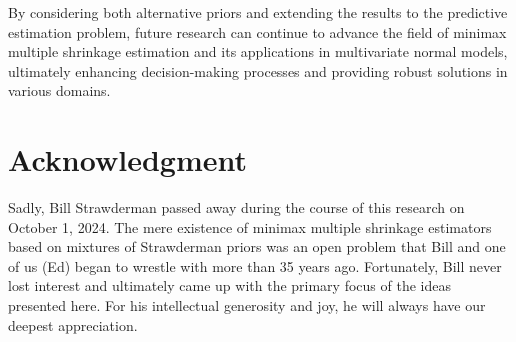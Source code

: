 \documentclass[11pt]{article}
\theoremstyle{definition}
\begin{document}
By considering both alternative priors and extending the results to the predictive estimation problem, future research can continue to advance the field of minimax multiple shrinkage estimation and its applications in multivariate normal models, ultimately enhancing decision-making processes and providing robust solutions in various domains.


\section*{Acknowledgment}

Sadly, Bill Strawderman passed away during the course of this research on October 1, 2024.  The mere existence of minimax multiple shrinkage estimators based on mixtures of Strawderman priors was an open problem that Bill and one of us (Ed) began to wrestle with more than 35 years ago.  Fortunately, Bill never lost interest and ultimately came up with the primary focus of the ideas presented here.  For his intellectual generosity and joy, he will always have our deepest appreciation.






\end{document}
